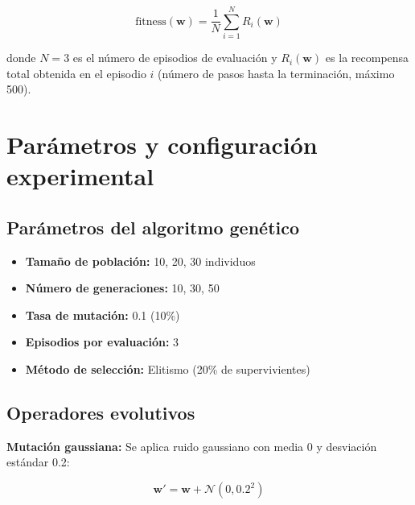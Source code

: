 \documentclass[12pt,a4paper]{article}
\begin{document}
\begin{equation}
\text{fitness}(\mathbf{w}) = \frac{1}{N} \sum_{i=1}^{N} R_i(\mathbf{w})
\end{equation}

donde $N = 3$ es el número de episodios de evaluación y $R_i(\mathbf{w})$ es la recompensa total obtenida en el episodio $i$ (número de pasos hasta la terminación, máximo 500).

\section{Parámetros y configuración experimental}

\subsection{Parámetros del algoritmo genético}
\begin{itemize}
    \item \textbf{Tamaño de población:} 10, 20, 30 individuos
    \item \textbf{Número de generaciones:} 10, 30, 50
    \item \textbf{Tasa de mutación:} 0.1 (10\%)
    \item \textbf{Episodios por evaluación:} 3
    \item \textbf{Método de selección:} Elitismo (20\% de supervivientes)
\end{itemize}

\subsection{Operadores evolutivos}
\textbf{Mutación gaussiana:} Se aplica ruido gaussiano con media 0 y desviación estándar 0.2:

\begin{equation}
\mathbf{w}' = \mathbf{w} + \mathcal{N}(0, 0.2^2)
\end{equation}
\end{document}
